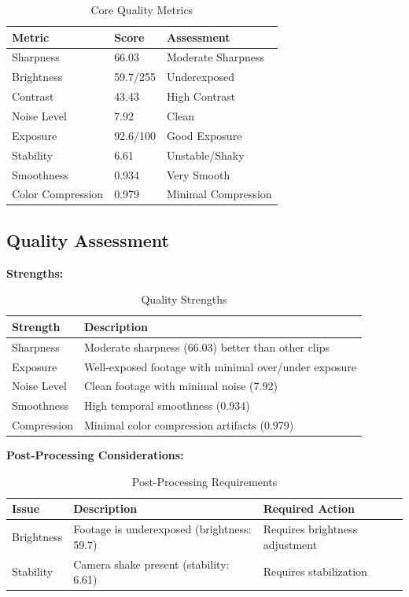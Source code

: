 \documentclass[
  11pt,
]{article}
\begin{document}
\begin{table}[h]
\centering
\small
\caption{Core Quality Metrics}
\label{tab-quality-metrics}
\begin{tabular}{p{3.5cm}p{2cm}p{5.5cm}}
\toprule
\textbf{Metric} & \textbf{Score} & \textbf{Assessment} \\
\midrule
Sharpness & 66.03 & Moderate Sharpness \\
Brightness & 59.7/255 & Underexposed \\
Contrast & 43.43 & High Contrast \\
Noise Level & 7.92 & Clean \\
Exposure & 92.6/100 & Good Exposure \\
Stability & 6.61 & Unstable/Shaky \\
Smoothness & 0.934 & Very Smooth \\
Color Compression & 0.979 & Minimal Compression \\
\bottomrule
\end{tabular}
\end{table}

\needspace{12cm}
\subsection{Quality Assessment}

\textbf{Strengths:}

\begin{table}[h]
\centering
\small
\caption{Quality Strengths}
\label{tab-strengths}
\begin{tabular}{p{2cm}p{7cm}}
\toprule
\textbf{Strength} & \textbf{Description} \\
\midrule
Sharpness & Moderate sharpness (66.03) better than other clips \\
Exposure & Well-exposed footage with minimal over/under exposure \\
Noise Level & Clean footage with minimal noise (7.92) \\
Smoothness & High temporal smoothness (0.934) \\
Compression & Minimal color compression artifacts (0.979) \\
\bottomrule
\end{tabular}
\end{table}

\textbf{Post-Processing Considerations:}

\begin{table}[h]
\centering
\small
\caption{Post-Processing Requirements}
\label{tab-post-processing}
\begin{tabular}{p{2cm}p{4cm}p{3cm}}
\toprule
\textbf{Issue} & \textbf{Description} & \textbf{Required Action} \\
\midrule
Brightness & Footage is underexposed (brightness: 59.7) & Requires brightness adjustment \\
Stability & Camera shake present (stability: 6.61) & Requires stabilization \\
\bottomrule
\end{tabular}
\end{table}
\end{document}
